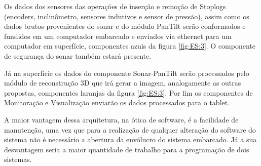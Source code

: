 Os dados dos sensores das operações de inserção e remoção de Stoplogs (encoders,
inclinômetro, sensores indutivos e sensor de pressão), assim como os dados
brutos provenientes do sonar e do módulo PanTilt serão conformados e fundidos em
um computador embarcado e enviados via ethernet para um computador em
superfície, componentes azuis da figura \ref{fig:ES:3}. O componente de
segurança do sonar também estará presente.



Já na superfície os dados do componente Sonar-PanTilt serão processados pelo
módulo de reconstrução 3D que irá gerar a imagem, analogamente as outras
propostas, componentes laranjas da figura \ref{fig:ES:3}.
Por fim os componentes de Monitoração e Visualiza\-ção enviarão os dados
processados para o tablet.

A maior vantagem dessa arquitetura, na ótica de software, é a facilidade de
manutenção, uma vez que para a realização de qualquer alteração do software do
sistema não é necessário a abertura da envólucro do sistema embarcado. Já a sua
desvantagem seria a maior quantidade de trabalho para a programação de dois
sistemas.